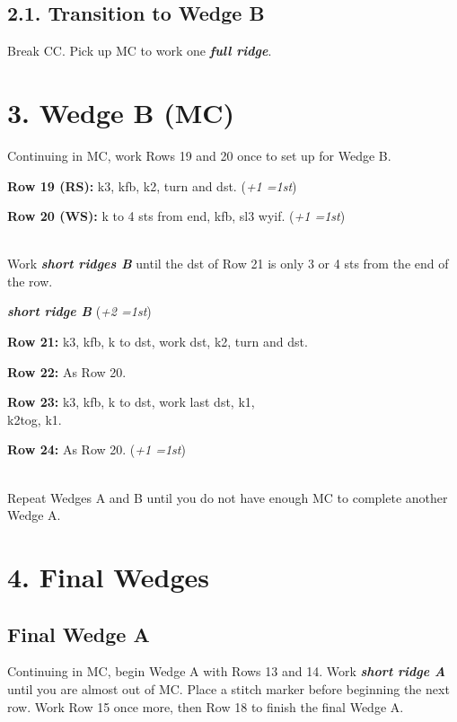 \documentclass[12pt]{article}
\newcommand{\vocab}[1]{\emph{\textbf{#1}}} %
\newcommand{\rowDir}[1]{\textbf{#1:}} %
\newcommand{\wiggle}[1]{\colorbox{wiggle}{#1}} %
\newcommand{\increase}[1]{(\emph{+#1 
	\ifnum#1=1{st}\else{sts}\fi})}
\begin{document}
\begin{multicols}{2}
\subsection*{2.1. Transition to Wedge B}

Break CC. Pick up MC to work one \vocab{full ridge}.


\newpage

\section*{3. Wedge B (MC)}

Continuing in MC, work Rows 19 and 20 once to set up for Wedge B.

\rowDir{Row 19 (RS)} k3, kfb, k2, turn and dst. \increase{1}

\rowDir{Row 20 (WS)} k to 4 sts from end, kfb, sl3 wyif. \increase{1}

~\\
Work \vocab{short ridges B} until the dst of Row 21 is only 3 \wiggle{or 4} sts from the end of the row.

\begin{framed}
\vocab{short ridge B} \increase{2}\vspace{0.5em}

\rowDir{Row 21} k3, kfb, k to dst, work dst, k2, turn and dst.

\rowDir{Row 22} As Row 20.
\end{framed}

\rowDir{Row 23} k3, kfb, k to dst, work last dst, \wiggle{k1,} \\k2tog, k1.

\rowDir{Row 24} As Row 20. \increase{1}

~\\
Repeat Wedges A and B until you do not have enough MC to complete another Wedge A.

\section*{4. Final Wedges}

\subsection*{Final Wedge A}

Continuing in MC, begin Wedge A with Rows 13 and 14. Work \vocab{short ridge A} until you are almost out of MC. Place a stitch marker before beginning the next row. Work Row 15 once more, then Row 18 to finish the final Wedge A.


\end{multicols}
\end{document}
